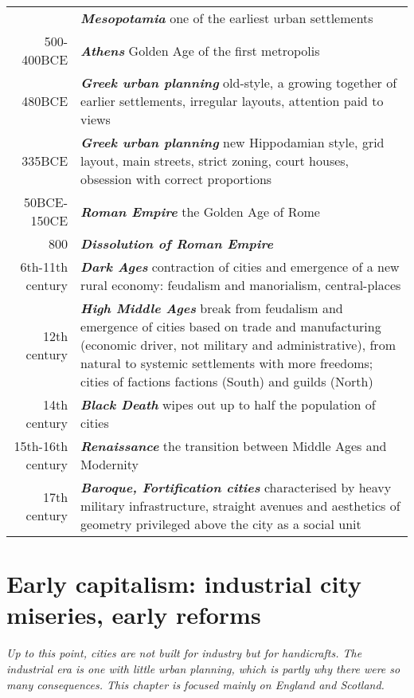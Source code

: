 \documentclass{article}
\newcommand{\foo}{\hspace{-2.3pt}$\bullet$ \hspace{5pt} }
\newcommand{\bisection}[1]{\textbf{\textit{#1}}}
\begin{document}
\begin{tabular}{r |@{\foo} p{}}
 & \bisection{Mesopotamia} one of the earliest urban settlements \\
500-400BCE & \bisection{Athens} Golden Age of the first metropolis \\
480BCE  & \bisection{Greek urban planning} old-style, a growing together of earlier settlements, irregular layouts, attention paid to views \\
335BCE  & \bisection{Greek urban planning} new Hippodamian style, grid layout, main streets, strict zoning, court houses, obsession with correct proportions \\
50BCE-150CE & \bisection{Roman Empire} the Golden Age of Rome \\
800 & \bisection{Dissolution of Roman Empire} \\
6th-11th century & \bisection{Dark Ages} contraction of cities and emergence of a new rural economy: feudalism and manorialism, central-places \\
12th century & \bisection{High Middle Ages} break from feudalism and emergence of cities based on trade and manufacturing (economic driver, not military and administrative), from natural to systemic settlements with more freedoms; cities of factions factions (South) and guilds (North) \\
14th century & \bisection{Black Death} wipes out up to half the population of cities \\
15th-16th century & \bisection{Renaissance} the transition between Middle Ages and Modernity \\
17th century & \bisection{Baroque, Fortification cities} characterised by heavy military infrastructure, straight avenues and aesthetics of geometry privileged above the city as a social unit \\
\end{tabular}


\pagebreak
\section{Early capitalism: industrial city miseries, early reforms}

\textit{Up to this point, cities are not built for industry but for handicrafts. The industrial era is one with little urban planning, which is partly why there were so many consequences. This chapter is focused mainly on England and Scotland.}
\end{document}
